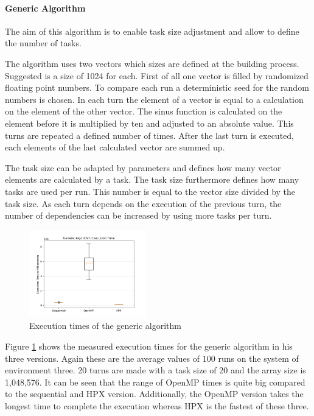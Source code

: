   \paragraph{Generic Algorithm}
  The aim of this algorithm is to enable task size adjustment and allow to define the number of tasks.
  
  The algorithm uses two vectors which sizes are defined at the building process.
  Suggested is a size of 1024 for each.
  First of all one vector is filled by randomized floating point numbers.
  To compare each run a deterministic seed for the random numbers is chosen.
  In each turn the element of a vector is equal to a calculation on the element of the other vector.
  The sinus function is calculated on the element before it is multiplied by ten and adjusted to an absolute value.
  This turns are repeated a defined number of times.
  After the last turn is executed, each elements of the last calculated vector are summed up.
  
  The task size can be adapted by parameters and defines how many vector elements are calculated by a task.
  The task size furthermore defines how many tasks are used per run.
  This number is equal to the vector size divided by the task size.
  As each turn depends on the execution of the previous turn, the number of dependencies can be increased by using more tasks per turn.
\begin{figure}[htbp]
	\centering
	\includegraphics[width=0.45\textwidth]{figures/generic_NoOp.png}
	\caption{Execution times of the generic algorithm}
	\label{fig:gen_NoOp}
\end{figure}

Figure \ref{fig:gen_NoOp} shows the measured execution times for the generic algorithm in his three versions.
Again these are the average values of 100 runs on the system of environment three.
20 turns are made with a task size of 20 and the array size is 1,048,576.
It can be seen that the range of OpenMP times is quite big compared to the sequential and HPX version.
Additionally, the OpenMP version takes the longest time to complete the execution whereas HPX is the fastest of these three. 
		
